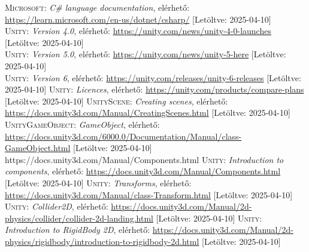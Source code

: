 \documentclass[
]{thesis-ekf}
\theoremstyle{definition}
\theoremstyle{remark}
\begin{document}
\begin{thebibliography}{2}
\textsc{Microsoft}: \emph{C\# language documentation}, elérhető:
\url{https://learn.microsoft.com/en-us/dotnet/csharp/} [Letöltve: 2025-04-10]\\
\textsc{Unity}: \emph{Version 4.0}, elérhető:
\url{https://unity.com/news/unity-4-0-launches} [Letöltve: 2025-04-10]\\
\textsc{Unity}: \emph{Version 5.0}, elérhető:
\url{https://unity.com/news/unity-5-here} [Letöltve: 2025-04-10]\\
\textsc{Unity}: \emph{Version 6}, elérhető:
\url{https://unity.com/releases/unity-6-releases} [Letöltve: 2025-04-10]
\textsc{Unity}: \emph{Licences}, elérhető:
\url{https://unity.com/products/compare-plans} [Letöltve: 2025-04-10]
\textsc{UnityScene}: \emph{Creating scenes}, elérhető:
\url{https://docs.unity3d.com/Manual/CreatingScenes.html} [Letöltve: 2025-04-10]
\textsc{UnityGameObject}: \emph{GameObject}, elérhető:
\url{https://docs.unity3d.com/6000.0/Documentation/Manual/class-GameObject.html} [Letöltve: 2025-04-10]
https://docs.unity3d.com/Manual/Components.html
\textsc{Unity}: \emph{Introduction to components}, elérhető:
\url{https://docs.unity3d.com/Manual/Components.html} [Letöltve: 2025-04-10]
\textsc{Unity}: \emph{Transforms}, elérhető:
\url{https://docs.unity3d.com/Manual/class-Transform.html} [Letöltve: 2025-04-10]
\textsc{Unity}: \emph{Collider2D}, elérhető:
\url{https://docs.unity3d.com/Manual/2d-physics/collider/collider-2d-landing.html} [Letöltve: 2025-04-10]
\textsc{Unity}: \emph{Introduction to RigidBody 2D}, elérhető:
\url{https://docs.unity3d.com/Manual/2d-physics/rigidbody/introduction-to-rigidbody-2d.html} [Letöltve: 2025-04-10]


\end{thebibliography}
\end{document}
